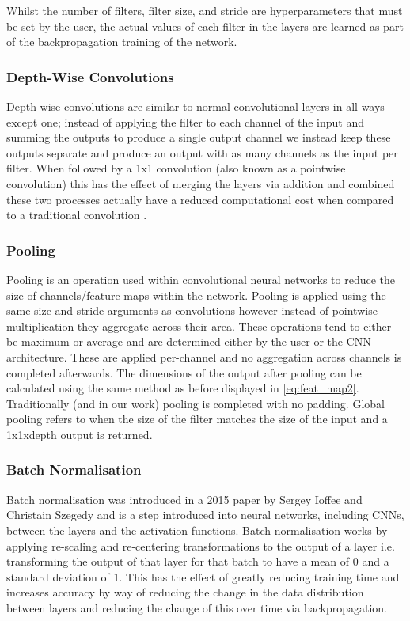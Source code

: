 \documentclass[12pt]{article}
\numberwithin{equation}{section}
\numberwithin{figure}{section}
\begin{document}
Whilst the number of filters, filter size, and stride are hyperparameters that must be set by the user, the actual values of each filter in the layers are learned as part of the backpropagation training of the network.


\subsubsection{Depth-Wise Convolutions}
Depth wise convolutions are similar to normal convolutional layers in all ways except one; instead of applying the filter to each channel of the input and summing the outputs to produce a single output channel we instead keep these outputs separate and produce an output with as many channels as the input per filter.  When followed by a 1x1 convolution (also known as a pointwise convolution) this has the effect of merging the layers via addition and combined these two processes actually have a reduced computational cost when compared to a traditional convolution \cite{Sandler2018}.

\subsubsection{Pooling}
Pooling is an operation used within convolutional neural networks to reduce the size of channels/feature maps within the network. Pooling is applied using the same size and stride arguments as convolutions however instead of pointwise multiplication they aggregate across their area. These operations tend to either be maximum or average and are determined either by the user or the CNN architecture. These are applied per-channel and no aggregation across channels is completed afterwards. The dimensions of the output after pooling can be calculated using the same method as before displayed in \cref{eq:feat_map2}. Traditionally (and in our work) pooling is completed with no padding. Global pooling refers to when the size of the filter matches the size of the input and a 1x1xdepth output is returned.

\subsubsection{Batch Normalisation}
Batch normalisation was introduced in a 2015 paper by Sergey Ioffee and Christain Szegedy\cite{Ioffe2015} and is a step introduced into neural networks, including CNNs, between the layers and the activation functions. Batch normalisation works by applying re-scaling and re-centering transformations to the output of a layer i.e. transforming the output of that layer for that batch to have a mean of 0 and a standard deviation of 1. This has the effect of greatly reducing training time and increases accuracy by way of reducing the change in the data distribution between layers and reducing the change of this over time via backpropagation. 
\end{document}
